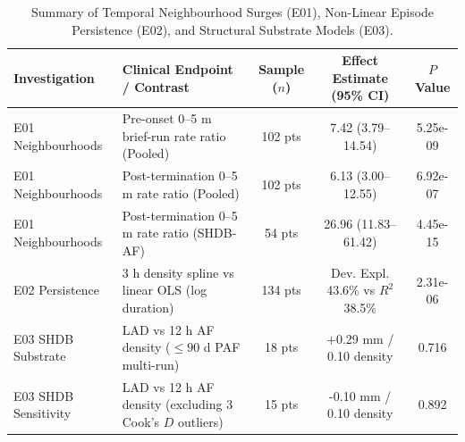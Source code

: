 \begin{table}[t]
\centering
\caption{Summary of Temporal Neighbourhood Surges (E01), Non-Linear Episode Persistence (E02), and Structural Substrate Models (E03).}
\label{tab:e01_e03_findings}
\small
\begin{tabular}{llccc}
\toprule
Investigation & Clinical Endpoint / Contrast & Sample ($n$) & Effect Estimate (95\% CI) & $P$ Value \\
\midrule
E01 Neighbourhoods & Pre-onset 0--5 m brief-run rate ratio (Pooled) & 102 pts & 7.42 (3.79--14.54) & 5.25e-09 \\
E01 Neighbourhoods & Post-termination 0--5 m rate ratio (Pooled) & 102 pts & 6.13 (3.00--12.55) & 6.92e-07 \\
E01 Neighbourhoods & Post-termination 0--5 m rate ratio (SHDB-AF) & 54 pts & 26.96 (11.83--61.42) & 4.45e-15 \\
\midrule
E02 Persistence & 3 h density spline vs linear OLS (log duration) & 134 pts & Dev. Expl. 43.6\% vs $R^2$ 38.5\% & 2.31e-06 \\
\midrule
E03 SHDB Substrate & LAD vs 12 h AF density ($\le 90$ d PAF multi-run) & 18 pts & +0.29 mm / 0.10 density & 0.716 \\
E03 SHDB Sensitivity & LAD vs 12 h AF density (excluding 3 Cook's $D$ outliers) & 15 pts & -0.10 mm / 0.10 density & 0.892 \\
\bottomrule
\end{tabular}
\end{table}
